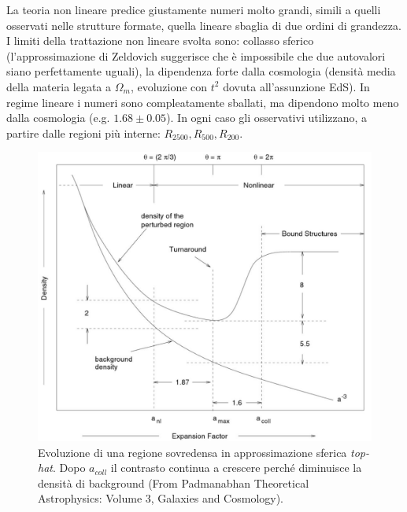 La teoria non lineare predice giustamente numeri molto grandi, simili a quelli osservati nelle strutture formate, quella lineare sbaglia di due ordini di grandezza. I limiti della trattazione non lineare svolta sono: collasso sferico (l'approssimazione di Zeldovich suggerisce che è impossibile che due autovalori siano perfettamente uguali), la dipendenza forte dalla cosmologia (densità media della materia legata a $\Omega_m$, evoluzione con $t^2$ dovuta all'assunzione EdS). In regime lineare i numeri sono compleatamente sballati, ma dipendono molto meno dalla cosmologia (e.g. $1.68\pm 0.05$). In ogni caso gli osservativi utilizzano, a partire dalle regioni più interne: $R_{2500}, R_{500}, R_{200}$.

\begin{figure}[H]
    \centering
    \includegraphics[width=.9 \textwidth]{Pictures/9/Padmanabhan.jpg}
    \caption{Evoluzione di una regione sovredensa in approssimazione sferica \textit{top-hat}. Dopo $a_{coll}$ il contrasto continua a crescere perché diminuisce la densità di background (From Padmanabhan Theoretical Astrophysics: Volume 3, Galaxies and Cosmology).}
\end{figure}



